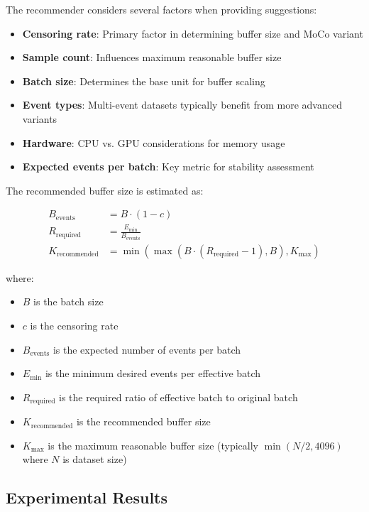 The recommender considers several factors when providing suggestions:

\begin{itemize}
\item \textbf{Censoring rate}: Primary factor in determining buffer size and MoCo variant
\item \textbf{Sample count}: Influences maximum reasonable buffer size
\item \textbf{Batch size}: Determines the base unit for buffer scaling
\item \textbf{Event types}: Multi-event datasets typically benefit from more advanced variants
\item \textbf{Hardware}: CPU vs. GPU considerations for memory usage
\item \textbf{Expected events per batch}: Key metric for stability assessment
\end{itemize}

\begin{equationbox}[title=Buffer Size Estimation]
  The recommended buffer size is estimated as:

  \begin{align}
    B_{\text{events}} &= B \cdot (1 - c)\\
    R_{\text{required}} &= \frac{E_{\min}}{B_{\text{events}}}\\
    K_{\text{recommended}} &= \min(\max(B \cdot (R_{\text{required}} - 1), B), K_{\max})
  \end{align}

  where:
  \begin{itemize}
  \item $B$ is the batch size
  \item $c$ is the censoring rate
  \item $B_{\text{events}}$ is the expected number of events per batch
  \item $E_{\min}$ is the minimum desired events per effective batch
  \item $R_{\text{required}}$ is the required ratio of effective batch to original batch
  \item $K_{\text{recommended}}$ is the recommended buffer size
  \item $K_{\max}$ is the maximum reasonable buffer size (typically $\min(N/2, 4096)$ where $N$ is dataset size)
  \end{itemize}
\end{equationbox}

\subsection{Experimental Results}

